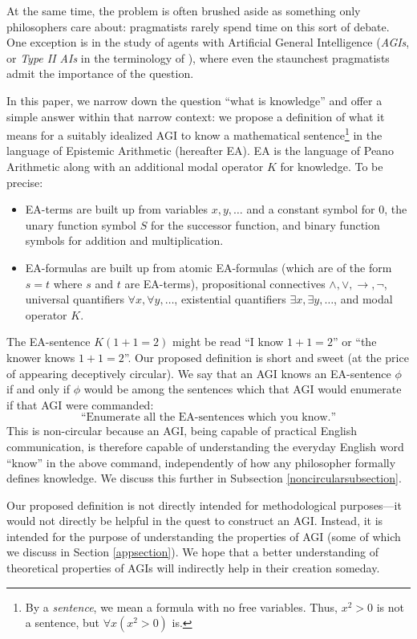 \documentclass[runningheads]{llncs}
\begin{document}
At the same time, the problem is often brushed aside as something only
philosophers care about: pragmatists rarely spend time
on this sort of debate. One exception is in the study of
agents with Artificial General Intelligence
(\emph{AGIs}, or \emph{Type II AIs} in the
terminology of \cite{aliman2020error}), where even the staunchest
pragmatists admit the importance of the question.

In this paper, we narrow down the question ``what is knowledge'' and offer
a simple answer within that narrow context:
we propose a definition of what it means for a suitably idealized AGI to know
a mathematical sentence\footnote{By a \emph{sentence}, we mean a formula with
no free variables. Thus, $x^2>0$ is not a sentence, but
$\forall x (x^2>0)$ is.} in the language of Epistemic Arithmetic \cite{shapiro} (hereafter
EA). EA is
the language of Peano Arithmetic along with an additional modal operator $K$ for
knowledge. To be precise:
\begin{itemize}
  \item EA-terms are built up from variables $x,y,\ldots$ and a constant symbol for $0$,
  the unary function symbol $S$ for the successor function, and binary function symbols
  for addition and multiplication.
  \item EA-formulas are built up from atomic EA-formulas (which are of the form $s=t$
  where $s$ and $t$ are EA-terms), propositional connectives
  $\wedge,\vee,\rightarrow,\neg$, universal quantifiers $\forall x,\forall y,\ldots$,
  existential quantifiers $\exists x,\exists y,\ldots$, and modal operator $K$.
\end{itemize}
The EA-sentence $K(1+1=2)$ might be read ``I know $1+1=2$''
or ``the knower knows $1+1=2$''. Our
proposed definition is short and
sweet (at the price of appearing deceptively circular). We say that
an AGI knows an EA-sentence $\phi$
if and only if $\phi$ would be among the sentences which that AGI would
enumerate if that AGI were commanded:
\[
\text{``Enumerate all the EA-sentences which you know.''}
\]
This is non-circular because an AGI, being capable of practical English
communication, is therefore capable of understanding the everyday English word
``know'' in the above command, independently of how any philosopher formally
defines knowledge. We discuss this further in Subsection \ref{noncircularsubsection}.

Our proposed definition is not directly intended
for methodological purposes---it would not
directly be helpful in the quest to construct an AGI. Instead, it is intended for
the purpose of understanding the properties of AGI (some of which
we discuss in Section \ref{appsection}). We hope that a better
understanding of theoretical properties of AGIs will indirectly help in their
creation someday.
\end{document}
